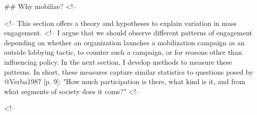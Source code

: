 ## Why mobilize? 
<!--


<!--%
This section offers a theory and hypotheses to explain variation in mass engagement.
<!--%
I argue that we should observe different patterns of engagement depending on whether an organization launches a mobilization campaign as an outside lobbying tactic, to counter such a campaign, or for reasons other than influencing policy. In the next section, I develop methods to measure these patterns. In short, these measures capture similar statistics to questions posed by @Verba1987 [p. 9]: "How much participation is there, what kind is it, and from what segments of society does it come?" <!-- %

<!--

